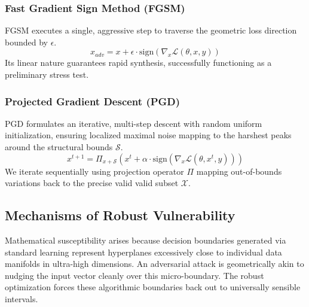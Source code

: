 \documentclass[12pt,a4paper]{article}
\begin{document}
\subsubsection{Fast Gradient Sign Method (FGSM)}
FGSM executes a single, aggressive step to traverse the geometric loss direction bounded by $\epsilon$.
\begin{equation}
    x_{adv} = x + \epsilon \cdot \text{sign}(\nabla_x \mathcal{L}(\theta, x, y))
\end{equation}
Its linear nature guarantees rapid synthesis, successfully functioning as a preliminary stress test.

\subsubsection{Projected Gradient Descent (PGD)}
PGD formulates an iterative, multi-step descent with random uniform initialization, ensuring localized maximal noise mapping to the harshest peaks around the structural bounds $\mathcal{S}$.
\begin{equation}
    x^{t+1} = \Pi_{x+\mathcal{S}} \left( x^t + \alpha \cdot \text{sign}(\nabla_x \mathcal{L}(\theta, x^t, y)) \right)
\end{equation}
We iterate sequentially using projection operator $\Pi$ mapping out-of-bounds variations back to the precise valid valid subset $\mathcal{X}$.

\subsection{Mechanisms of Robust Vulnerability}
Mathematical susceptibility arises because decision boundaries generated via standard learning represent hyperplanes excessively close to individual data manifolds in ultra-high dimensions. An adversarial attack is geometrically akin to nudging the input vector cleanly over this micro-boundary. The robust optimization forces these algorithmic boundaries back out to universally sensible intervals.


\end{document}
